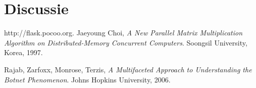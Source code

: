 \documentclass[11pt]{article}
\begin{document}
\section{Discussie}




\begin{thebibliography}{9}

  http://flask.pocoo.org.
  Jaeyoung Choi,
  \emph{A New Parallel Matrix Multiplication Algorithm on Distributed-Memory Concurrent Computers}.
  Soongsil University, Korea,
  1997.

  Rajab, Zarfoxx, Monrose, Terzis,
  \emph{A Multifaceted Approach to Understanding the Botnet Phenomenon}.
  Johns Hopkins University,
  2006.


\end{thebibliography}
\end{document}
